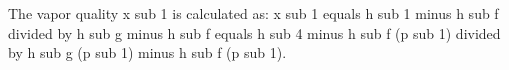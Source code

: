 The vapor quality x sub 1 is calculated as:  
x sub 1 equals h sub 1 minus h sub f divided by h sub g minus h sub f equals h sub 4 minus h sub f (p sub 1) divided by h sub g (p sub 1) minus h sub f (p sub 1).